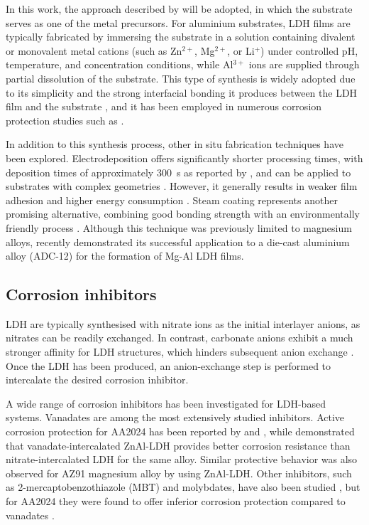 \documentclass[11pt,twoside,a4paper]{report}
\begin{document}
In this work, the approach described by \citet{BoualiReview2020} will be adopted, in which the substrate serves as one of the metal precursors. For aluminium substrates, LDH films are typically fabricated by immersing the substrate in a solution containing divalent or monovalent metal cations (such as Zn$^{2+}$, Mg$^{2+}$, or Li$^{+}$) under controlled pH, temperature, and concentration conditions, while Al$^{3+}$ ions are supplied through partial dissolution of the substrate. This type of synthesis is widely adopted due to its simplicity and the strong interfacial bonding it produces between the LDH film and the substrate \cite{Cao2022, Guo2009}, and it has been employed in numerous corrosion protection studies such as \cite{Iuzviuk2020, Tedim2014,Tedim2011}.

In addition to this synthesis process, other in situ fabrication techniques have been explored. Electrodeposition offers significantly shorter processing times, with deposition times of approximately 300~s as reported by \citet{He2020}, and can be applied to substrates with complex geometries \cite{Cao2022}. However, it generally results in weaker film adhesion and higher energy consumption \cite{Cao2022}. Steam coating represents another promising alternative, combining good bonding strength with an environmentally friendly process \cite{Pan2023, Cao2022}. Although this technique was previously limited to magnesium alloys, \citet{Matsui2025} recently demonstrated its successful application to a die-cast aluminium alloy (ADC-12) for the formation of Mg-Al LDH films.

\subsection{Corrosion inhibitors}
LDH are typically synthesised with nitrate ions as the initial interlayer anions, as nitrates can be readily exchanged. In contrast, carbonate anions exhibit a much stronger affinity for LDH structures, which hinders subsequent anion exchange \cite{Cao2022}. Once the LDH has been produced, an anion-exchange step is performed to intercalate the desired corrosion inhibitor.

A wide range of corrosion inhibitors has been investigated for LDH-based systems. Vanadates are among the most extensively studied inhibitors. Active corrosion protection for AA2024 has been reported by \citet{Tedim2011} and \citet{Yasakau2014}, while \citet{Zhang2015} demonstrated that vanadate-intercalated ZnAl-LDH provides better corrosion resistance than nitrate-intercalated LDH for the same alloy. Similar protective behavior was also observed for AZ91 magnesium alloy by \citet{Zhou2017} using ZnAl-LDH. Other inhibitors, such as 2-mercaptobenzothiazole (MBT) and molybdates, have also been studied \cite{Cao2022,Tedim2010,Zhang2015}, but for AA2024 they were found to offer inferior corrosion protection compared to vanadates \cite{Zhang2015,Tedim2010}.
\end{document}
